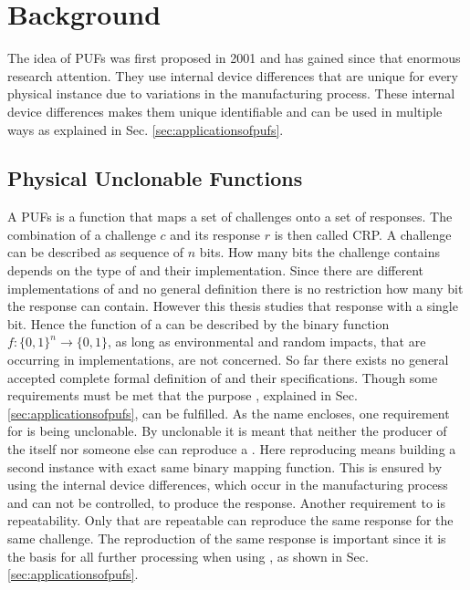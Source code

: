 \chapter{Background}
\label{cap:background}

The idea of \acfp{PUF} was first proposed in 2001 and has gained since that enormous research attention. %
They use internal device differences that are unique for every physical instance due to variations in the manufacturing process.
These internal device differences makes them unique identifiable and can be used in multiple ways as explained in Sec. \ref{sec:applicationsofpufs}.


\section{Physical Unclonable Functions}
\label{sec:pyhsicalunclonablefunctions}

A \acfp{PUF} is a function that maps a set of challenges onto a set of responses.
The combination of a challenge $c$ and its response $r$ is then called \ac{CRP}.
A challenge can be described as sequence of $n$ bits.
How many bits the challenge contains depends on the type of \puf and their implementation.
Since there are different implementations of \pufs and no general definition there is no restriction how many bit the response can contain.
However this thesis studies \pufs that response with a single bit.
Hence the function of a \puf can be described by the binary function $f: \{0, 1\}^n \to \{0,1\}$, as long as environmental and random impacts, that are occurring in \puf implementations, are not concerned.
So far there exists no general accepted complete formal definition of \pufs and their specifications. %
Though some requirements must be met that the purpose \pufs, explained in Sec. \ref{sec:applicationsofpufs}, can be fulfilled.
As the name encloses, one requirement for \pufs is being unclonable. %
By unclonable it is meant that neither the producer of the \puf itself nor someone else can reproduce a \puf.
Here reproducing means building a second instance with exact same binary mapping function.
This is ensured by using the internal device differences, which occur in the manufacturing process and can not be controlled, to produce the \puf response.
Another requirement to \pufs is repeatability.
Only \pufs that are repeatable can reproduce the same response for the same challenge.
The reproduction of the same response is important since it is the basis for all further processing when using \pufs, as shown in Sec. \ref{sec:applicationsofpufs}. %


